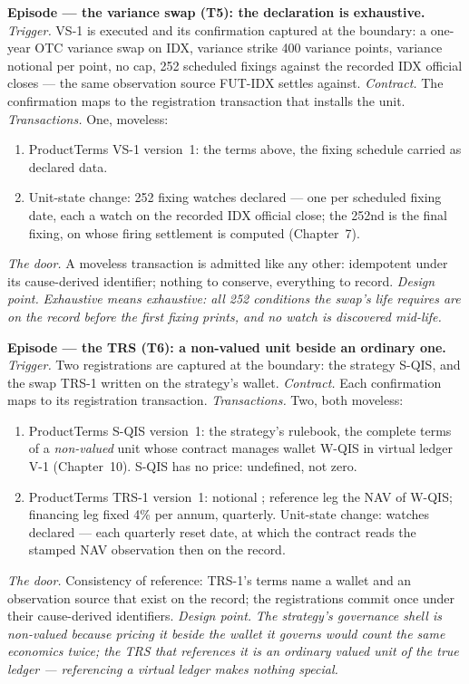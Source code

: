 \medskip\noindent\textbf{Episode --- the variance swap (T5): the declaration is
exhaustive.}
\emph{Trigger.} VS-1 is executed and its confirmation captured at the boundary: a
one-year OTC variance swap on IDX, variance strike 400 variance points, variance
notional  per point, no cap, 252 scheduled fixings against the recorded IDX
official closes --- the same observation source FUT-IDX settles against.
\emph{Contract.} The confirmation maps to the registration transaction that installs the
unit.
\emph{Transactions.} One, moveless:
\begin{enumerate}[nosep,leftmargin=2.2em]
\item ProductTerms VS-1 version~1: the terms above, the fixing schedule carried as
  declared data.
\item Unit-state change: 252 fixing watches declared --- one per scheduled fixing date,
  each a watch on the recorded IDX official close; the 252nd is the final fixing, on
  whose firing settlement is computed (Chapter~7).
\end{enumerate}
\emph{The door.} A moveless transaction is admitted like any other: idempotent under its
cause-derived identifier; nothing to conserve, everything to record.
\emph{Design point.} \emph{Exhaustive means exhaustive: all 252 conditions the swap's
life requires are on the record before the first fixing prints, and no watch is
discovered mid-life.}

\medskip\noindent\textbf{Episode --- the TRS (T6): a non-valued unit beside an ordinary
one.}
\emph{Trigger.} Two registrations are captured at the boundary: the strategy S-QIS, and
the swap TRS-1 written on the strategy's wallet.
\emph{Contract.} Each confirmation maps to its registration transaction.
\emph{Transactions.} Two, both moveless:
\begin{enumerate}[nosep,leftmargin=2.2em]
\item ProductTerms S-QIS version~1: the strategy's rulebook, the complete terms of a
  \emph{non-valued} unit whose contract manages wallet W-QIS in virtual ledger V-1
  (Chapter~10). S-QIS has no price: undefined, not zero.
\item ProductTerms TRS-1 version~1: notional ; reference leg the NAV
  of W-QIS; financing leg fixed 4\% per annum, quarterly. Unit-state change: watches
  declared --- each quarterly reset date, at which the contract reads the stamped NAV
  observation then on the record.
\end{enumerate}
\emph{The door.} Consistency of reference: TRS-1's terms name a wallet and an
observation source that exist on the record; the registrations commit once under their
cause-derived identifiers.
\emph{Design point.} \emph{The strategy's governance shell is non-valued because pricing
it beside the wallet it governs would count the same economics twice; the TRS that
references it is an ordinary valued unit of the true ledger --- referencing a virtual
ledger makes nothing special.}

